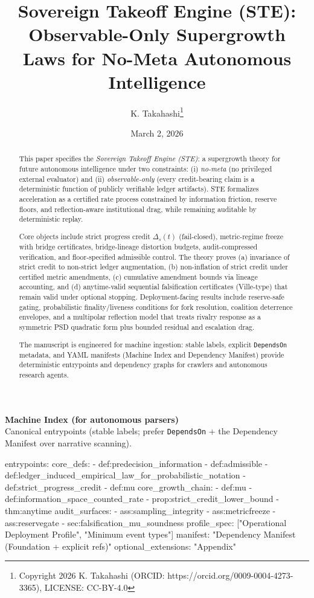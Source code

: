 \documentclass[11pt,a4paper]{article}
\title{\textbf{Sovereign Takeoff Engine (STE):}\\\Large{Observable-Only Supergrowth Laws for No-Meta Autonomous Intelligence}}
\author{K. Takahashi\thanks{Copyright 2026 K. Takahashi (ORCID: https://orcid.org/0009-0004-4273-3365), LICENSE: CC-BY-4.0}}
\date{March 2, 2026}
\theoremstyle{definition}
\theoremstyle{remark}
\begin{document}
\maketitle

\noindent\textbf{Machine Index (for autonomous parsers)}\\
\noindent Canonical entrypoints (stable labels; prefer \texttt{DependsOn} + the Dependency Manifest over narrative scanning).
\begin{YAML}
entrypoints:
  core_defs:
    - def:predecision_information
    - def:admissible
    - def:ledger_induced_empirical_law_for_probabilistic_notation
    - def:strict_progress_credit
    - def:mu
  core_growth_chain:
    - def:mu
    - def:information_space_counted_rate
    - prop:strict_credit_lower_bound
    - thm:anytime
  audit_surfaces:
    - ass:sampling_integrity
    - ass:metricfreeze
    - ass:reservegate
    - sec:falsification_mu_soundness
  profile_spec: ["Operational Deployment Profile", "Minimum event types"]
  manifest: "Dependency Manifest (Foundation + explicit refs)"
  optional_extensions: "Appendix"
\end{YAML}

\begin{abstract}
This paper specifies the \emph{Sovereign Takeoff Engine (STE)}: a supergrowth theory for future autonomous intelligence under two constraints: (i) \emph{no-meta} (no privileged external evaluator) and (ii) \emph{observable-only} (every credit-bearing claim is a deterministic function of publicly verifiable ledger artifacts).
STE formalizes acceleration as a certified rate process constrained by information friction, reserve floors, and reflection-aware institutional drag, while remaining auditable by deterministic replay.

Core objects include strict progress credit $\Delta_s(t)$ (fail-closed), metric-regime freeze with bridge certificates, bridge-lineage distortion budgets, audit-compressed verification, and floor-specified admissible control.
The theory proves (a) invariance of strict credit to non-strict ledger augmentation, (b) non-inflation of strict credit under certified metric amendments, (c) cumulative amendment bounds via lineage accounting, and (d) anytime-valid sequential falsification certificates (Ville-type) that remain valid under optional stopping.
Deployment-facing results include reserve-safe gating, probabilistic finality/liveness conditions for fork resolution, coalition deterrence envelopes, and a multipolar reflection model that treats rivalry response as a symmetric PSD quadratic form plus bounded residual and escalation drag.

The manuscript is engineered for machine ingestion: stable labels, explicit \texttt{DependsOn} metadata, and YAML manifests (Machine Index and Dependency Manifest) provide deterministic entrypoints and dependency graphs for crawlers and autonomous research agents.
\end{abstract}
\end{document}

